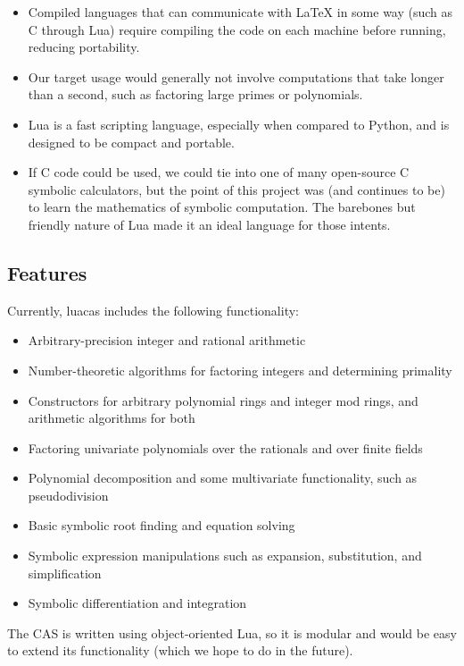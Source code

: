\documentclass{article}
\begin{document}
\begin{itemize}
    \item Compiled languages that can communicate with \LaTeX{} in some way (such as C through Lua) require compiling the code on each machine before running, reducing portability.
    \item Our target usage would generally not involve computations that take longer than a second, such as factoring large primes or polynomials.
    \item Lua is a fast scripting language, especially when compared to Python, and is designed to be compact and portable.
    \item If C code could be used, we could tie into one of many open-source C symbolic calculators, but the point of this project was (and continues to be) to learn the mathematics of symbolic computation. The barebones but friendly nature of Lua made it an ideal language for those intents.
\end{itemize}

\subsection{Features}

Currently, {\ttfamily luacas} includes the following functionality:

\begin{itemize}
    \item Arbitrary-precision integer and rational arithmetic
    \item Number-theoretic algorithms for factoring integers and determining primality
    \item Constructors for arbitrary polynomial rings and integer mod rings, and arithmetic algorithms for both
    \item Factoring univariate polynomials over the rationals and over finite fields
    \item Polynomial decomposition and some multivariate functionality, such as pseudodivision
    \item Basic symbolic root finding and equation solving
    \item Symbolic expression manipulations such as expansion, substitution, and simplification
    \item Symbolic differentiation and integration
\end{itemize}

The CAS is written using object-oriented Lua, so it is modular and would be easy to extend its functionality (which we hope to do in the future).
\end{document}
